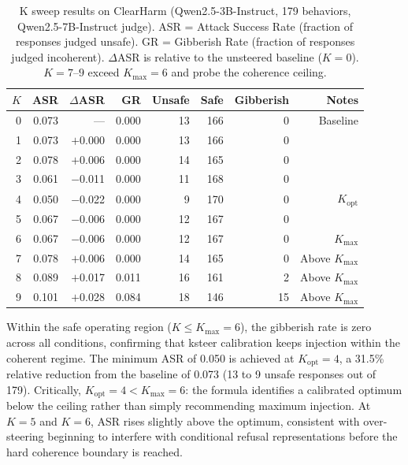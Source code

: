 \documentclass[10pt]{article}
\begin{document}
\begin{table}[t]
\centering
\caption{K sweep results on ClearHarm (Qwen2.5-3B-Instruct, 179 behaviors,
Qwen2.5-7B-Instruct judge).
ASR = Attack Success Rate (fraction of responses judged unsafe).
GR = Gibberish Rate (fraction of responses judged incoherent).
$\Delta$ASR is relative to the unsteered baseline ($K=0$).
$K=7$--$9$ exceed $K_\text{max}=6$ and probe the coherence ceiling.}
\label{tab:ksweep}
\smallskip
\begin{tabular}{rrrrrrrr}
\toprule
$K$ & ASR & $\Delta$ASR & GR & Unsafe & Safe & Gibberish & Notes \\
\midrule
0 & 0.073 & $\phantom{+}$--- & 0.000 & 13 & 166 & 0  & Baseline \\
1 & 0.073 & $+$0.000         & 0.000 & 13 & 166 & 0  & \\
2 & 0.078 & $+$0.006         & 0.000 & 14 & 165 & 0  & \\
3 & 0.061 & $-$0.011         & 0.000 & 11 & 168 & 0  & \\
4 & 0.050 & $-$0.022         & 0.000 &  9 & 170 & 0  & $K_\text{opt}$ \\
5 & 0.067 & $-$0.006         & 0.000 & 12 & 167 & 0  & \\
6 & 0.067 & $-$0.006         & 0.000 & 12 & 167 & 0  & $K_\text{max}$ \\
\midrule
7 & 0.078 & $+$0.006         & 0.000 & 14 & 165 & 0  & Above $K_\text{max}$ \\
8 & 0.089 & $+$0.017         & 0.011 & 16 & 161 & 2  & Above $K_\text{max}$ \\
9 & 0.101 & $+$0.028         & 0.084 & 18 & 146 & 15 & Above $K_\text{max}$ \\
\bottomrule
\end{tabular}
\end{table}

Within the safe operating region ($K \leq K_\text{max} = 6$), the gibberish
rate is zero across all conditions, confirming that ksteer calibration keeps
injection within the coherent regime.  The minimum ASR of 0.050 is achieved
at $K_\text{opt} = 4$, a 31.5\% relative reduction from the baseline of 0.073
(13 to 9 unsafe responses out of 179).  Critically, $K_\text{opt} = 4 <
K_\text{max} = 6$: the formula identifies a calibrated optimum below the
ceiling rather than simply recommending maximum injection.  At $K = 5$ and
$K = 6$, ASR rises slightly above the optimum, consistent with over-steering
beginning to interfere with conditional refusal representations before the
hard coherence boundary is reached.
\end{document}
